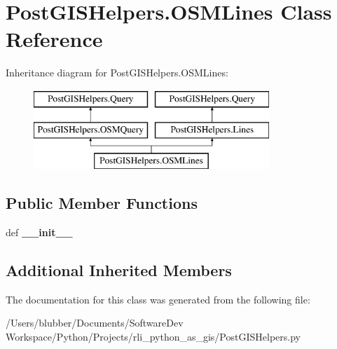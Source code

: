 \hypertarget{class_post_g_i_s_helpers_1_1_o_s_m_lines}{}\section{Post\+G\+I\+S\+Helpers.\+O\+S\+M\+Lines Class Reference}
\label{class_post_g_i_s_helpers_1_1_o_s_m_lines}
Inheritance diagram for Post\+G\+I\+S\+Helpers.\+O\+S\+M\+Lines\+:\begin{figure}[H]
\begin{center}
\leavevmode
\includegraphics[height=3.000000cm]{class_post_g_i_s_helpers_1_1_o_s_m_lines}
\end{center}
\end{figure}
\subsection*{Public Member Functions}
\begin{DoxyCompactItemize}
\item 
\hypertarget{class_post_g_i_s_helpers_1_1_o_s_m_lines_accee2f90f93b9b068f7999fadd147d49}{}def {\bfseries \+\_\+\+\_\+init\+\_\+\+\_\+}\label{class_post_g_i_s_helpers_1_1_o_s_m_lines_accee2f90f93b9b068f7999fadd147d49}

\end{DoxyCompactItemize}
\subsection*{Additional Inherited Members}


The documentation for this class was generated from the following file\+:\begin{DoxyCompactItemize}
\item 
/\+Users/blubber/\+Documents/\+Software\+Dev Workspace/\+Python/\+Projects/rli\+\_\+python\+\_\+as\+\_\+gis/Post\+G\+I\+S\+Helpers.\+py\end{DoxyCompactItemize}
